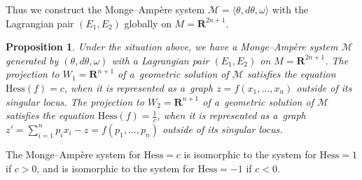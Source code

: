 \documentclass[pdftex]{sigma}
\newtheorem{Prop}[Th]{Proposition}
\begin{document}
Thus we construct
the Monge--Amp{\`e}re system $\mathcal{M}=\langle \theta, d\theta,
\omega \rangle $
with the Lagrangian pair $(E_1,E_2)$ globally on $M={\mathbf{R}}^{2n+1}$.


\begin{Prop}
Under the situation above,
we have a Monge--Amp{\`e}re system
$\mathcal{M}$ generated by $(\theta, d\theta, \omega)$
with a Lagrangian pair $(E_1,E_2)$ on $M={\mathbf R}^{2n+1}$.
The projection to $W_1 = {\mathbf{R}}^{n+1}$
of a~geometric solution of $\mathcal{M}$ satisfies the equation
$\textrm{Hess}(f)=c$, when it is represented as a~graph
$z = f(x_1,\dots,x_n)$
outside of its singular locus.
The projection to $W_2 = {\mathbf{R}}^{n+1}$
of a~geometric solution of $\mathcal{M}$ satisfies the equation
$\textrm{Hess}(f)=\frac{1}{c}$, when it is represented as a~graph
$z'=\sum\limits_{i=1}^np_ix_i-z = f(p_1,\dots,p_n)$
outside of its singular locus.
\end{Prop}

\begin{Rem}
The Monge--Amp{\`e}re system for ${\mathrm{Hess}} = c$
is isomorphic to the system for ${\mathrm{Hess}} = 1$ if $c > 0$, and
is isomorphic to the system for ${\mathrm{Hess}} = -1$ if $c < 0$.
\end{Rem}
\end{document}
